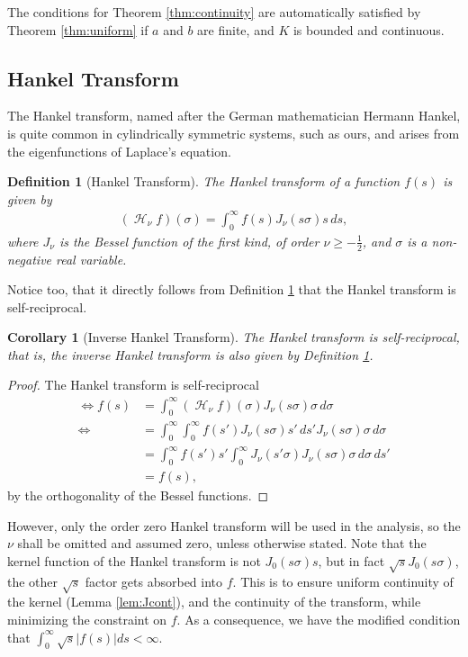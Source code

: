 \documentclass[12pt]{article}
\DeclareMathOperator{\Hsign}{\mathscr{H}}
\newcommand\Hank[2][]{{\left( \Hsign_{#1} #2 \right) }}
\newtheorem{definition}[theorem]{Definition}
\newtheorem{corollary}[theorem]{Corollary}
\begin{document}
The conditions for Theorem \ref{thm:continuity} are automatically satisfied by Theorem \ref{thm:uniform} if $a$ and $b$ are finite, and $K$ is bounded and continuous.

\subsection{Hankel Transform}

The Hankel transform, named after the German mathematician Hermann Hankel, is quite common in cylindrically symmetric systems, such as ours, and arises from the eigenfunctions of Laplace's equation.

\begin{definition}[Hankel Transform]
\label{def:hanktrans}
The Hankel transform of a function $f(s)$ is given by
\begin{align*}
\Hank[\nu]{f}(\sigma) = \int_0^\infty f(s) J_\nu(s \sigma) s \, ds,
\end{align*}
where $J_\nu$ is the Bessel function of the first kind, of order $\nu \geq -\frac{1}{2}$, and $\sigma$ is a non-negative real variable.
\end{definition}

Notice too, that it directly follows from Definition \ref{def:hanktrans} that the Hankel transform is self-reciprocal.

\begin{corollary}[Inverse Hankel Transform]
\label{def:invhanktrans}
The Hankel transform is self-reciprocal, that is, the inverse Hankel transform is also given by Definition \ref{def:hanktrans}.
\end{corollary}
\begin{proof}
The Hankel transform is self-reciprocal
\begin{align*}
\iff f(s) &= \int_0^\infty \Hank[\nu]{f}(\sigma) J_\nu(s \sigma) \sigma \, d\sigma \\
\iff &= \int_0^\infty \int_0^\infty f(s') J_\nu(s \sigma) s' \, ds' J_\nu(s \sigma) \sigma \, d\sigma \\
&= \int_0^\infty f(s') s' \int_0^\infty J_\nu(s' \sigma) J_\nu(s \sigma) \sigma \, d\sigma \, ds' \\
&= f(s),
\end{align*}
by the orthogonality of the Bessel functions.
\end{proof}

However, only the order zero Hankel transform will be used in the analysis, so the $\nu$ shall be omitted and assumed zero, unless otherwise stated. Note that the kernel function of the Hankel transform is not $J_0 (s \sigma) s$, but in fact $\sqrt{s} J_0 (s \sigma)$, the other $\sqrt{s}$ factor gets absorbed into $f$. This is to ensure uniform continuity of the kernel (Lemma \ref{lem:Jcont}), and the continuity of the transform, while minimizing the constraint on $f$. As a consequence, we have the modified condition that $\int_0^\infty \sqrt{s}|f(s)| ds < \infty$.
\end{document}
